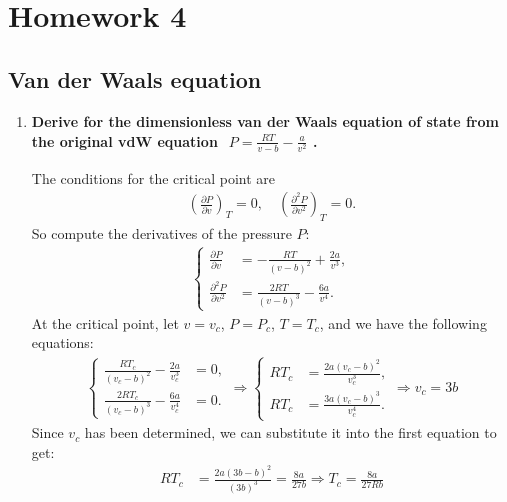 \documentclass[../../main.tex]{subfiles}
\begin{document}
\section{Homework 4}
\subsection{Van der Waals equation}
  \begin{enumerate}
    \item \textbf{Derive for the dimensionless van der Waals equation of state from the original vdW equation $\begin{aligned}
      P = \frac{RT}{v-b} - \frac{a}{v^{2}}
    \end{aligned}$.} 

    The conditions for the critical point are
    \begin{align*}
      \left(\frac{\partial P}{\partial v}\right)_{T} = 0,\quad \left(\frac{\partial^{2} P}{\partial v^{2}}\right)_{T} = 0.
    \end{align*}
    So compute the derivatives of the pressure $P$:
    \begin{align*}
      \begin{cases}
        \frac{\partial P}{\partial v} &= -\frac{RT}{(v-b)^{2}} + \frac{2a}{v^{3}},\\
      \frac{\partial^{2}P}{\partial v^{2}} &= \frac{2RT}{(v-b)^{3}} - \frac{6a}{v^{4}}.
      \end{cases}
    \end{align*}
    At the critical point, let $v = v_{c}$, $P = P_{c}$, $T = T_{c}$, and we have the following equations:
    \begin{align*}
      \begin{cases}
        \frac{RT_{c}}{(v_{c}-b)^{2}} - \frac{2a}{v_{c}^{3}} &= 0,\\
        \frac{2RT_{c}}{(v_{c}-b)^{3}} - \frac{6a}{v_{c}^{4}} &= 0.
      \end{cases}
      \Rightarrow \begin{cases}
        RT_{c} &= \frac{2a(v_{c}-b)^{2}}{v_{c}^{3}},\\
        RT_{c} &= \frac{3a(v_{c}-b)^{3}}{v_{c}^{4}}.
      \end{cases}
      \Rightarrow v_{c} = 3b
    \end{align*}
    Since $v_{c}$ has been determined, we can substitute it into the first equation to get:
    \begin{align*}
      RT_{c} &= \frac{2a(3b-b)^{2}}{(3b)^{3}} = \frac{8a}{27b}\Rightarrow T_{c} = \frac{8a}{27Rb}\\

\end{align*}
\end{enumerate}
\end{document}
